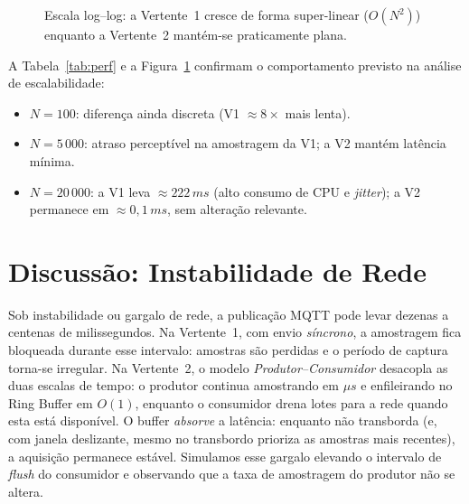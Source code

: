 \documentclass[11pt,a4paper]{article}
\begin{document}
\begin{figure}[h]
\centering
{}
\caption{Escala log--log: a Vertente~1 cresce de forma super-linear ($O(N^2)$)
enquanto a Vertente~2 mantém-se praticamente plana.}
\label{fig:perf}
\end{figure}

A Tabela~\ref{tab:perf} e a Figura~\ref{fig:perf} confirmam o comportamento
previsto na análise de escalabilidade:
\begin{itemize}
  \item $N = 100$: diferença ainda discreta (V1 $\approx 8\times$ mais lenta).
  \item $N = 5\,000$: atraso perceptível na amostragem da V1; a V2 mantém
  latência mínima.
  \item $N = 20\,000$: a V1 leva $\approx 222\,ms$ (alto consumo de CPU e
  \emph{jitter}); a V2 permanece em $\approx 0{,}1\,ms$, sem alteração relevante.
\end{itemize}

\section{Discussão: Instabilidade de Rede}
Sob instabilidade ou gargalo de rede, a publicação MQTT pode levar dezenas a
centenas de milissegundos. Na Vertente~1, com envio \emph{síncrono}, a
amostragem fica bloqueada durante esse intervalo: amostras são perdidas e o
período de captura torna-se irregular. Na Vertente~2, o modelo
\emph{Produtor--Consumidor} desacopla as duas escalas de tempo: o produtor
continua amostrando em $\mu s$ e enfileirando no Ring Buffer em $O(1)$, enquanto
o consumidor drena lotes para a rede quando esta está disponível. O buffer
\emph{absorve} a latência: enquanto não transborda (e, com janela deslizante,
mesmo no transbordo prioriza as amostras mais recentes), a aquisição
permanece estável. Simulamos esse gargalo elevando o intervalo de \emph{flush}
do consumidor e observando que a taxa de amostragem do produtor não se altera.
\end{document}
